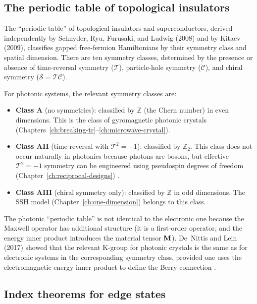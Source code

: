 \subsection{The periodic table of topological insulators}
\label{sec:appB-periodic-table}

The ``periodic table'' of topological insulators and superconductors,
derived independently by Schnyder, Ryu, Furusaki, and Ludwig (2008)
and by Kitaev (2009), classifies gapped free-fermion Hamiltonians by
their symmetry class and spatial dimension.  There are ten symmetry
classes, determined by the presence or absence of time-reversal
symmetry ($\mathcal{T}$), particle-hole symmetry ($\mathcal{C}$), and
chiral symmetry ($\mathcal{S}=\mathcal{TC}$).

For photonic systems, the relevant symmetry classes are:
\begin{itemize}
  \item \textbf{Class A} (no symmetries): classified by $\mathbb{Z}$
    (the Chern number) in even dimensions.  This is the class of
    gyromagnetic photonic crystals (Chapters~\ref{ch:breaking-tr}--\ref{ch:microwave-crystal}).
  \item \textbf{Class AII} (time-reversal with $\mathcal{T}^2=-1$):
    classified by $\mathbb{Z}_2$.  This class does not occur naturally
    in photonics because photons are bosons, but effective
    $\mathcal{T}^2=-1$ symmetry can be engineered using pseudospin
    degrees of freedom (Chapter~\ref{ch:reciprocal-designs})
    \cite{bernevig2006quantum,kane2005sub}.
  \item \textbf{Class AIII} (chiral symmetry only): classified by
    $\mathbb{Z}$ in odd dimensions.  The SSH model
    (Chapter~\ref{ch:one-dimension}) belongs to this class.
\end{itemize}

The photonic ``periodic table'' is not identical to the electronic
one because the Maxwell operator has additional structure (it is a
first-order operator, and the energy inner product introduces the
material tensor $\mathbf{M}$).  De~Nittis and Lein (2017) showed that the
relevant K-group for photonic crystals is the same as for electronic
systems in the corresponding symmetry class, provided one uses the
electromagnetic energy inner product to define the Berry connection
\cite{nittis2020equivalence}.

\subsection{Index theorems for edge states}
\label{sec:appB-index}

